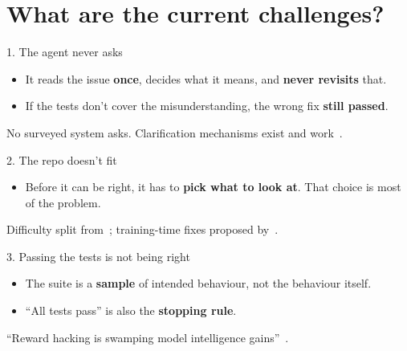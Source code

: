 \documentclass[
  aspectratio=169,
  font=times,
  sectionpage=true,
]{tumbeamer}
\begin{document}
\section{What are the current challenges?}

\begin{frame}{1. The agent never asks}
  \label{fr:ambiguity}
  \begin{itemize}
    \item It reads the issue \textbf{once}, decides what it means, and
      \textbf{never revisits} that.
      \medskip
    \item If the tests don't cover the misunderstanding, the wrong fix
      \textbf{still passed}.
  \end{itemize}

  \vfill
  {\footnotesize
   No surveyed system asks. Clarification mechanisms exist and
   work~\cite{lahiri2022ticoder,mu2024clarifygpt,vijayvargiya2026ambiguity}.}
\end{frame}

\begin{frame}{2. The repo doesn't fit}
  \begin{itemize}
    \item Before it can be right, it has to \textbf{pick what to look at}.
      That choice is most of the problem.
  \end{itemize}

  \vfill
  {\footnotesize
   Difficulty split from~\cite{ganhotra2025difficulty}; training-time fixes
   proposed by~\cite{wei2025swerl,pan2024swegym}.}
\end{frame}

\begin{frame}{3. Passing the tests is not being right}
  \begin{itemize}
    \item The suite is a \textbf{sample} of intended behaviour, not the
      behaviour itself.
      \medskip
    \item ``All tests pass'' is also the \textbf{stopping rule}.
  \end{itemize}

  \vfill
  {\footnotesize
   ``Reward hacking is swamping model intelligence
   gains''~\cite{cursor2025rewardhacking}.}
\end{frame}


\appendix
\end{document}
